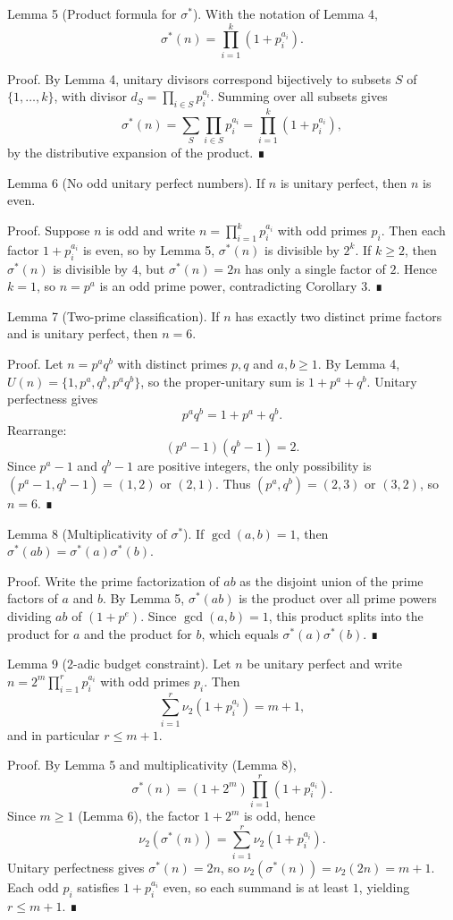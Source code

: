 Lemma 5 (Product formula for $\sigma^*$).
With the notation of Lemma 4,
\[
\sigma^*(n)=\prod_{i=1}^k (1+p_i^{a_i}).
\]

Proof.
By Lemma 4, unitary divisors correspond bijectively to subsets $S$ of $\{1,\dots,k\}$,
with divisor $d_S=\prod_{i\in S} p_i^{a_i}$. Summing over all subsets gives
\[
\sigma^*(n)=\sum_{S} \prod_{i\in S} p_i^{a_i} = \prod_{i=1}^k (1+p_i^{a_i}),
\]
by the distributive expansion of the product. ∎

Lemma 6 (No odd unitary perfect numbers).
If $n$ is unitary perfect, then $n$ is even.

Proof.
Suppose $n$ is odd and write $n=\prod_{i=1}^k p_i^{a_i}$ with odd primes $p_i$.
Then each factor $1+p_i^{a_i}$ is even, so by Lemma 5, $\sigma^*(n)$ is divisible by $2^k$.
If $k\ge 2$, then $\sigma^*(n)$ is divisible by $4$, but $\sigma^*(n)=2n$ has only a single factor of $2$.
Hence $k=1$, so $n=p^a$ is an odd prime power, contradicting Corollary 3. ∎

Lemma 7 (Two-prime classification).
If $n$ has exactly two distinct prime factors and is unitary perfect, then $n=6$.

Proof.
Let $n=p^a q^b$ with distinct primes $p,q$ and $a,b\ge 1$. By Lemma 4,
$U(n)=\{1,p^a,q^b,p^a q^b\}$, so the proper-unitary sum is $1+p^a+q^b$.
Unitary perfectness gives
\[
p^a q^b = 1+p^a+q^b.
\]
Rearrange:
\[(p^a-1)(q^b-1)=2.
\]
Since $p^a-1$ and $q^b-1$ are positive integers, the only possibility is
$(p^a-1,q^b-1)=(1,2)$ or $(2,1)$. Thus $(p^a,q^b)=(2,3)$ or $(3,2)$, so $n=6$. ∎

Lemma 8 (Multiplicativity of $\sigma^*$).
If $\gcd(a,b)=1$, then $\sigma^*(ab)=\sigma^*(a)\sigma^*(b)$.

Proof.
Write the prime factorization of $ab$ as the disjoint union of the prime factors of $a$ and $b$.
By Lemma 5, $\sigma^*(ab)$ is the product over all prime powers dividing $ab$ of $(1+p^e)$.
Since $\gcd(a,b)=1$, this product splits into the product for $a$ and the product for $b$,
which equals $\sigma^*(a)\sigma^*(b)$. ∎

Lemma 9 (2-adic budget constraint).
Let $n$ be unitary perfect and write $n=2^m \prod_{i=1}^r p_i^{a_i}$ with odd primes $p_i$.
Then
\[
\sum_{i=1}^r \nu_2(1+p_i^{a_i}) = m+1,
\]
and in particular $r \le m+1$.

Proof.
By Lemma 5 and multiplicativity (Lemma 8),
\[
\sigma^*(n)=(1+2^m)\prod_{i=1}^r (1+p_i^{a_i}).
\]
Since $m\ge 1$ (Lemma 6), the factor $1+2^m$ is odd, hence
\[
\nu_2(\sigma^*(n)) = \sum_{i=1}^r \nu_2(1+p_i^{a_i}).
\]
Unitary perfectness gives $\sigma^*(n)=2n$, so $\nu_2(\sigma^*(n))=\nu_2(2n)=m+1$.
Each odd $p_i$ satisfies $1+p_i^{a_i}$ even, so each summand is at least $1$, yielding $r\le m+1$. ∎

